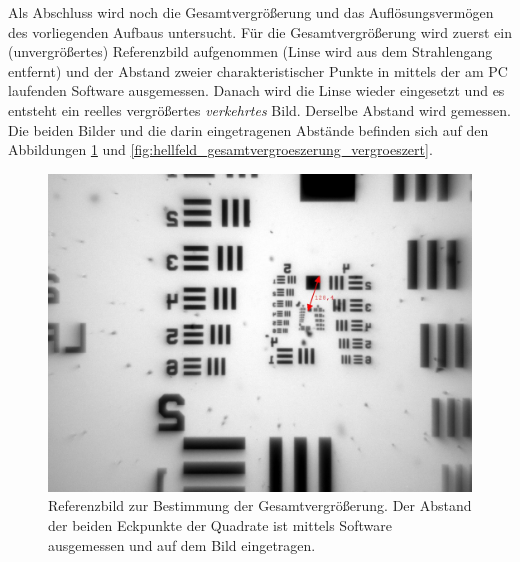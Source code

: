 \documentclass[ngerman]{scrartcl}
\begin{document}
Als Abschluss wird noch die Gesamtvergrößerung und das Auflösungsvermögen des vorliegenden Aufbaus untersucht. Für die Gesamtvergrößerung wird zuerst ein (unvergrößertes) Referenzbild aufgenommen (Linse wird aus dem Strahlengang entfernt) und der Abstand zweier charakteristischer Punkte in \si{\px} mittels der am PC laufenden Software ausgemessen. Danach wird die Linse wieder eingesetzt und es entsteht ein reelles vergrößertes \emph{verkehrtes} Bild. Derselbe Abstand wird gemessen. Die beiden Bilder und die darin eingetragenen Abstände befinden sich auf den Abbildungen \ref{fig:hellfeld_gesamtvergroeszerung_referenz} und \ref{fig:hellfeld_gesamtvergroeszerung_vergroeszert}.
%
\setcapindent{0pt}
\begin{figure}[H]
    \centering
    \begin{minipage}[t]{0.475\linewidth}
        \centering
        \includegraphics[width=\linewidth]{fig/Versuch3/hellfeld_4.1_referenz.jpg}
        \caption[Hellfeld Gesamtvergrößerung Referenz]{Referenzbild zur Bestimmung der Gesamtvergrößerung. Der Abstand der beiden Eckpunkte der Quadrate ist mittels Software ausgemessen und auf dem Bild eingetragen.}
        \label{fig:hellfeld_gesamtvergroeszerung_referenz}
    \end{minipage}%
    \hspace*{\fill}
    \begin{minipage}[t]{0.475\linewidth}
        \centering

\end{minipage}
\end{figure}
\end{document}
